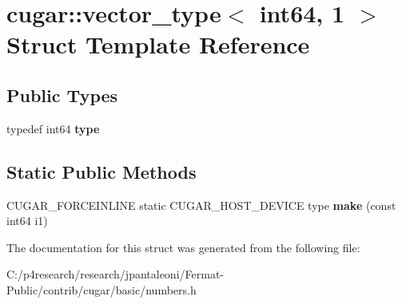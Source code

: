\hypertarget{structcugar_1_1vector__type_3_01int64_00_011_01_4}{}\section{cugar\+:\+:vector\+\_\+type$<$ int64, 1 $>$ Struct Template Reference}
\label{structcugar_1_1vector__type_3_01int64_00_011_01_4}
\subsection*{Public Types}
\begin{DoxyCompactItemize}
\item 
\mbox{\label{structcugar_1_1vector__type_3_01int64_00_011_01_4_a7401230d160f17c58f0b9543a106c00f}} 
typedef int64 {\bfseries type}
\end{DoxyCompactItemize}
\subsection*{Static Public Methods}
\begin{DoxyCompactItemize}
\item 
\mbox{\label{structcugar_1_1vector__type_3_01int64_00_011_01_4_a973406c6a21f1d87a75c7d6e568aa235}} 
C\+U\+G\+A\+R\+\_\+\+F\+O\+R\+C\+E\+I\+N\+L\+I\+NE static C\+U\+G\+A\+R\+\_\+\+H\+O\+S\+T\+\_\+\+D\+E\+V\+I\+CE type {\bfseries make} (const int64 i1)
\end{DoxyCompactItemize}


The documentation for this struct was generated from the following file\+:\begin{DoxyCompactItemize}
\item 
C\+:/p4research/research/jpantaleoni/\+Fermat-\/\+Public/contrib/cugar/basic/numbers.\+h\end{DoxyCompactItemize}
